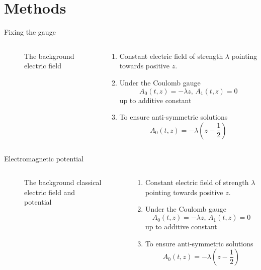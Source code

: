 \section{Methods}

\begin{frame}{Fixing the gauge}
	\begin{columns}
	    \begin{column}{0.5\textwidth}
\begin{figure}[ht]
    \centering
    \caption{The background electric field}
    \label{fig:the-background-classical-electric-field}
\end{figure}
	    \end{column}
	    \begin{column}{0.5\textwidth}
		    \begin{enumerate}[<+->]
		    	\item 
	    Constant electric field of strength $\lambda$ pointing towards positive $z.$
    \item Under the Coulomb gauge $$A_0(t, z) = -\lambda z,\, A_1(t, z) = 0$$ up to additive constant
    \item To ensure anti-symmetric solutions $$A_0(t, z)=-\lambda(z-\frac{1}{2})$$

		    \end{enumerate}
	    \end{column}
	\end{columns}

\end{frame}

\begin{frame}{Electromagnetic potential}
	\begin{columns}
	    \begin{column}{0.5\textwidth}
\begin{figure}[ht]
    \centering
    \caption{The background classical electric field and potential}
    \label{fig:the-background-classical-electric-field-and-potential}
\end{figure}
	    \end{column}
	    \begin{column}{0.5\textwidth}
		    \begin{enumerate}
		    	\item 
	    Constant electric field of strength $\lambda$ pointing towards positive $z.$
    \item Under the Coulomb gauge $$A_0(t, z) = -\lambda z,\, A_1(t, z) = 0$$ up to additive constant
    \item To ensure anti-symmetric solutions $$A_0(t, z)=-\lambda(z-\frac{1}{2})$$

		    \end{enumerate}
	    \end{column}
	\end{columns}
\end{frame}

